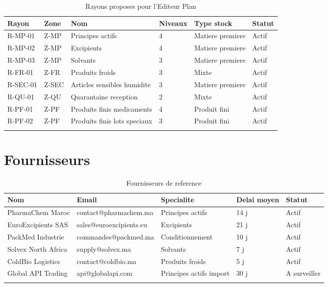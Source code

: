 \documentclass[11pt,a4paper]{article}
\begin{document}
\begin{longtable}{|p{2cm}|p{2cm}|p{3cm}|p{2cm}|p{3cm}|p{2cm}|}
\hline
\textbf{Rayon} & \textbf{Zone} & \textbf{Nom} & \textbf{Niveaux} & \textbf{Type stock} & \textbf{Statut} \\
\hline
R-MP-01 & Z-MP & Principes actifs & 4 & Matiere premiere & Actif \\
\hline
R-MP-02 & Z-MP & Excipients & 4 & Matiere premiere & Actif \\
\hline
R-MP-03 & Z-MP & Solvants & 3 & Matiere premiere & Actif \\
\hline
R-FR-01 & Z-FR & Produits froids & 3 & Mixte & Actif \\
\hline
R-SEC-01 & Z-SEC & Articles sensibles humidite & 3 & Matiere premiere & Actif \\
\hline
R-QU-01 & Z-QU & Quarantaine reception & 2 & Mixte & Actif \\
\hline
R-PF-01 & Z-PF & Produits finis medicaments & 4 & Produit fini & Actif \\
\hline
R-PF-02 & Z-PF & Produits finis lots speciaux & 3 & Produit fini & Actif \\
\hline
\caption{Rayons proposes pour l'Editeur Plan}
\end{longtable}

\section{Fournisseurs}

\begin{longtable}{|p{3.5cm}|p{3.2cm}|p{3.4cm}|p{2cm}|p{2cm}|}
\hline
\textbf{Nom} & \textbf{Email} & \textbf{Specialite} & \textbf{Delai moyen} & \textbf{Statut} \\
\hline
PharmaChem Maroc & contact@pharmachem.ma & Principes actifs & 14 j & Actif \\
\hline
EuroExcipients SAS & sales@euroexcipients.eu & Excipients & 21 j & Actif \\
\hline
PackMed Industrie & commandes@packmed.ma & Conditionnement & 10 j & Actif \\
\hline
Solvex North Africa & supply@solvex.ma & Solvants & 7 j & Actif \\
\hline
ColdBio Logistics & contact@coldbio.ma & Produits froids & 5 j & Actif \\
\hline
Global API Trading & api@globalapi.com & Principes actifs import & 30 j & A surveiller \\
\hline
\caption{Fournisseurs de reference}
\end{longtable}
\end{document}
